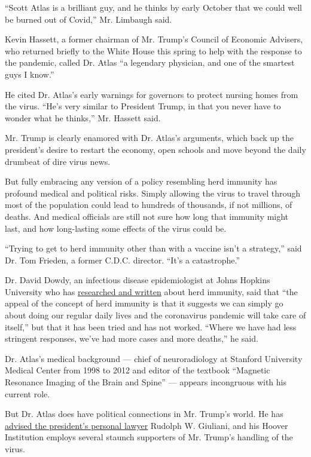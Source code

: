 ``Scott Atlas is a brilliant guy, and he thinks by early October that we
could well be burned out of Covid,'' Mr. Limbaugh said.

Kevin Hassett, a former chairman of Mr. Trump's Council of Economic
Advisers, who returned briefly to the White House this spring to help
with the response to the pandemic, called Dr. Atlas ``a legendary
physician, and one of the smartest guys I know.''

He cited Dr. Atlas's early warnings for governors to protect nursing
homes from the virus. ``He's very similar to President Trump, in that
you never have to wonder what he thinks,'' Mr. Hassett said.

Mr. Trump is clearly enamored with Dr. Atlas's arguments, which back up
the president's desire to restart the economy, open schools and move
beyond the daily drumbeat of dire virus news.

But fully embracing any version of a policy resembling herd immunity has
profound medical and political risks. Simply allowing the virus to
travel through most of the population could lead to hundreds of
thousands, if not millions, of deaths. And medical officials are still
not sure how long that immunity might last, and how long-lasting some
effects of the virus could be.

``Trying to get to herd immunity other than with a vaccine isn't a
strategy,'' said Dr. Tom Frieden, a former C.D.C. director. ``It's a
catastrophe.''

Dr. David Dowdy, an infectious disease epidemiologist at Johns Hopkins
University who has
\href{https://www.jhsph.edu/covid-19/articles/achieving-herd-immunity-with-covid19.html}{researched
and written} about herd immunity, said that ``the appeal of the concept
of herd immunity is that it suggests we can simply go about doing our
regular daily lives and the coronavirus pandemic will take care of
itself,'' but that it has been tried and has not worked. ``Where we have
had less stringent responses, we've had more cases and more deaths,'' he
said.

Dr. Atlas's medical background --- chief of neuroradiology at Stanford
University Medical Center from 1998 to 2012 and editor of the textbook
``Magnetic Resonance Imaging of the Brain and Spine'' --- appears
incongruous with his current role.

But Dr. Atlas does have political connections in Mr. Trump's world. He
has
\href{https://pnhp.org/news/rudy-giulianis-health-care-proposal/}{advised
the president's personal lawyer} Rudolph W. Giuliani, and his Hoover
Institution employs several staunch supporters of Mr. Trump's handling
of the virus.

